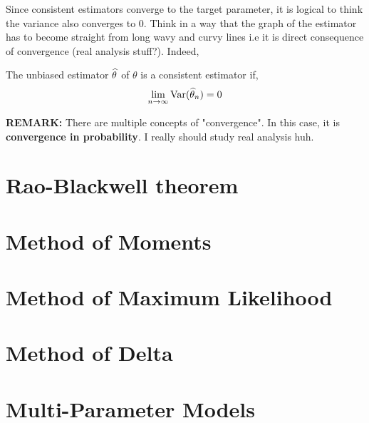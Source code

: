 Since consistent estimators converge to the target parameter, it is logical to think the variance also converges to $0$. Think in a way that the graph of the estimator has to become straight from long wavy and curvy lines i.e it is direct consequence of convergence (real analysis stuff?). Indeed,
\begin{theorem}
    The unbiased estimator ${\widehat{\theta}}$ of $\theta$ is a consistent estimator if, 
    \[ \lim_{n \rightarrow \infty} {\operatorname{Var}}({\widehat{\theta}}_{n}) = 0 \]
\end{theorem}
\textbf{REMARK:} There are multiple concepts of "convergence". In this case, it is \textbf{convergence in probability}. I really should study real analysis huh.

\section{Rao-Blackwell theorem}
\section{Method of Moments}
\section{Method of Maximum Likelihood}
\section{Method of Delta}
\section{Multi-Parameter Models}


